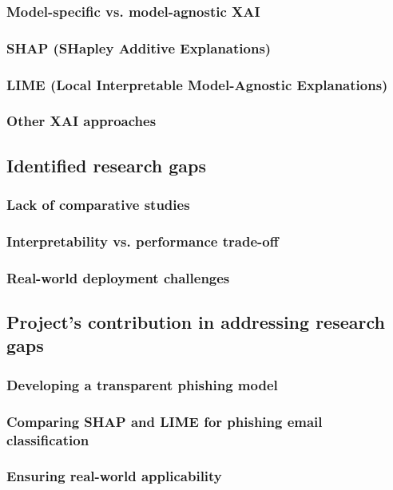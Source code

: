 \subsubsection*{Model-specific vs. model-agnostic XAI}

\subsubsection*{SHAP (SHapley Additive Explanations)}

\subsubsection*{LIME (Local Interpretable Model-Agnostic Explanations)}

\subsubsection*{Other XAI approaches}

\subsection*{Identified research gaps}

\subsubsection*{Lack of comparative studies}

\subsubsection*{Interpretability vs. performance trade-off}

\subsubsection*{Real-world deployment challenges}

\subsection*{Project's contribution in addressing research gaps}

\subsubsection*{Developing a transparent phishing model}

\subsubsection*{Comparing SHAP and LIME for phishing email classification}

\subsubsection*{Ensuring real-world applicability}
